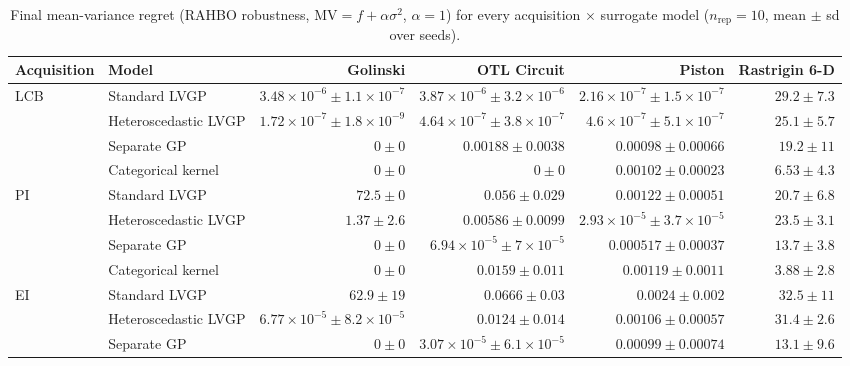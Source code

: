 \begin{table}[htbp]
\centering
\small
\setlength{\tabcolsep}{4pt}
\setlength{\fboxsep}{2pt}
\caption{Final mean-variance regret (RAHBO robustness, $\mathrm{MV}=f+\alpha\sigma^2$, $\alpha=1$) for every acquisition $\times$ surrogate model ($n_{\mathrm{rep}}=10$, mean $\pm$ sd over seeds).}
\label{tab:mv_nrep10}
\begin{tabular}{llrrrr}
\toprule
Acquisition & Model & Golinski & OTL Circuit & Piston & Rastrigin 6-D \\
\midrule
LCB & Standard LVGP & $3.48{\times}10^{-6} \pm 1.1{\times}10^{-7}$ & $3.87{\times}10^{-6} \pm 3.2{\times}10^{-6}$ & \colorbox{green!20}{{\boldmath$2.16{\times}10^{-7} \pm 1.5{\times}10^{-7}$}} & $29.2 \pm 7.3$ \\
 & Heteroscedastic LVGP & $1.72{\times}10^{-7} \pm 1.8{\times}10^{-9}$ & $4.64{\times}10^{-7} \pm 3.8{\times}10^{-7}$ & $4.6{\times}10^{-7} \pm 5.1{\times}10^{-7}$ & $25.1 \pm 5.7$ \\
 & Separate GP & \colorbox{green!20}{{\boldmath$0 \pm 0$}} & $0.00188 \pm 0.0038$ & $0.00098 \pm 0.00066$ & $19.2 \pm 11$ \\
 & Categorical kernel & \colorbox{green!20}{{\boldmath$0 \pm 0$}} & \colorbox{green!20}{{\boldmath$0 \pm 0$}} & $0.00102 \pm 0.00023$ & {\boldmath$6.53 \pm 4.3$} \\
\midrule
PI & Standard LVGP & $72.5 \pm 0$ & $0.056 \pm 0.029$ & $0.00122 \pm 0.00051$ & $20.7 \pm 6.8$ \\
 & Heteroscedastic LVGP & $1.37 \pm 2.6$ & $0.00586 \pm 0.0099$ & {\boldmath$2.93{\times}10^{-5} \pm 3.7{\times}10^{-5}$} & $23.5 \pm 3.1$ \\
 & Separate GP & \colorbox{green!20}{{\boldmath$0 \pm 0$}} & {\boldmath$6.94{\times}10^{-5} \pm 7{\times}10^{-5}$} & $0.000517 \pm 0.00037$ & $13.7 \pm 3.8$ \\
 & Categorical kernel & \colorbox{green!20}{{\boldmath$0 \pm 0$}} & $0.0159 \pm 0.011$ & $0.00119 \pm 0.0011$ & \colorbox{green!20}{{\boldmath$3.88 \pm 2.8$}} \\
\midrule
EI & Standard LVGP & $62.9 \pm 19$ & $0.0666 \pm 0.03$ & $0.0024 \pm 0.002$ & $32.5 \pm 11$ \\
 & Heteroscedastic LVGP & $6.77{\times}10^{-5} \pm 8.2{\times}10^{-5}$ & $0.0124 \pm 0.014$ & $0.00106 \pm 0.00057$ & $31.4 \pm 2.6$ \\
 & Separate GP & \colorbox{green!20}{{\boldmath$0 \pm 0$}} & {\boldmath$3.07{\times}10^{-5} \pm 6.1{\times}10^{-5}$} & {\boldmath$0.00099 \pm 0.00074$} & $13.1 \pm 9.6$ \\

\end{tabular}
\end{table}
